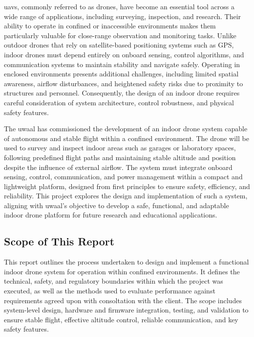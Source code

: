 \glspl{uav}, commonly referred to as drones, have become an essential tool across a wide range of applications, including surveying, inspection, and research. Their ability to operate in confined or inaccessible environments makes them particularly valuable for close-range observation and monitoring tasks. Unlike outdoor drones that rely on satellite-based positioning systems such as GPS, indoor drones must depend entirely on onboard sensing, control algorithms, and communication systems to maintain stability and navigate safely. Operating in enclosed environments presents additional challenges, including limited spatial awareness, airflow disturbances, and heightened safety risks due to proximity to structures and personnel. Consequently, the design of an indoor drone requires careful consideration of system architecture, control robustness, and physical safety features. 

The \gls{uwaal} has commissioned the development of an indoor drone system capable of autonomous and stable flight within a confined environment. The drone will be used to survey and inspect indoor areas such as garages or laboratory spaces, following predefined flight paths and maintaining stable altitude and position despite the influence of external airflow. The system must integrate onboard sensing, control, communication, and power management within a compact and lightweight platform, designed from first principles to ensure safety, efficiency, and reliability. This project explores the design and implementation of such a system, aligning with \gls{uwaal}’s objective to develop a safe, functional, and adaptable indoor drone platform for future research and educational applications. 

\subsection{Scope of This Report}

This report outlines the  process undertaken to design and implement a functional indoor drone system for operation within confined environments. It defines the technical, safety, and regulatory boundaries within which the project was executed, as well as the methods used to evaluate performance against requirements agreed upon with consoltation with the client. The scope includes system-level design, hardware and firmware integration, testing, and validation to ensure stable flight, effective altitude control, reliable communication, and key safety features. 

